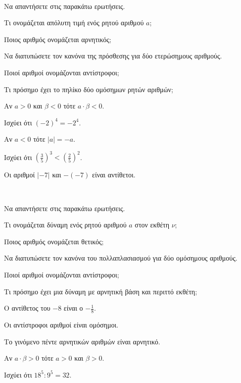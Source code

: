 \documentclass[ektypwsh]{diag-xelatex}
\begin{document}
\thewria
\begin{thema}
\item \mbox{}\\\vspace{-7mm}
\begin{erwthma}
\item Να απαντήσετε στις παρακάτω ερωτήσεις.
\begin{rlist}
\item Τι ονομάζεται απόλυτη τιμή ενός ρητού αριθμού $ a $;
\item Ποιος αριθμός ονομάζεται αρνητικός;
\item Να διατυπώσετε τον κανόνα της πρόσθεσης για δύο ετερώσημους αριθμούς.
\item Ποιοί αριθμοί ονομάζονται αντίστροφοι;
\item Τι πρόσημο έχει το πηλίκο δύο ομόσημων ρητών αριθμών;
\end{rlist}
\item \swstolathos
\begin{rlist}
\item Αν $ a>0 $ και $ \beta<0 $ τότε $ a\cdot\beta<0 $.
\item Ισχύει ότι $ (-2)^4=-2^4 $.
\item Αν $ a<0 $ τότε $ |a|=-a $.
\item Ισχύει ότι $ \left( \frac{3}{5}\right)^3<\left( \frac{2}{5}\right)^2 $.
\item Οι αριθμοί $ |-7| $ και $ -(-7) $ είναι αντίθετοι.
\end{rlist}
\end{erwthma}
\item \mbox{}\\\vspace{-7mm}
\begin{erwthma}
\item Να απαντήσετε στις παρακάτω ερωτήσεις.
\begin{rlist}
\item Τι ονομάζεται δύναμη ενός ρητού αριθμού $ a $ στον εκθέτη $ \nu $;
\item Ποιος αριθμός ονομάζεται θετικός;
\item Να διατυπώσετε τον κανόνα του πολλαπλασιασμού για δύο ομόσημους αριθμούς.
\item Ποιοί αριθμοί ονομάζονται αντίστροφοι;
\item Τι πρόσημο έχει μια δύναμη με αρνητική βάση και περιττό εκθέτη;
\end{rlist}
\item \swstolathos
\begin{rlist}
\item Ο αντίθετος του $ -8 $ είναι ο $ -\frac{1}{8} $.
\item Οι αντίστροφοι αριθμοί είναι ομόσημοι.
\item Το γινόμενο πέντε αρνητικών αριθμών είναι αρνητικό.
\item Αν $ a\cdot\beta>0 $ τότε $ a>0 $ και $ \beta>0 $.
\item Ισχύει ότι $ 18^5:9^5=32 $.
\end{rlist}
\end{erwthma}
\end{thema}
\end{document}
